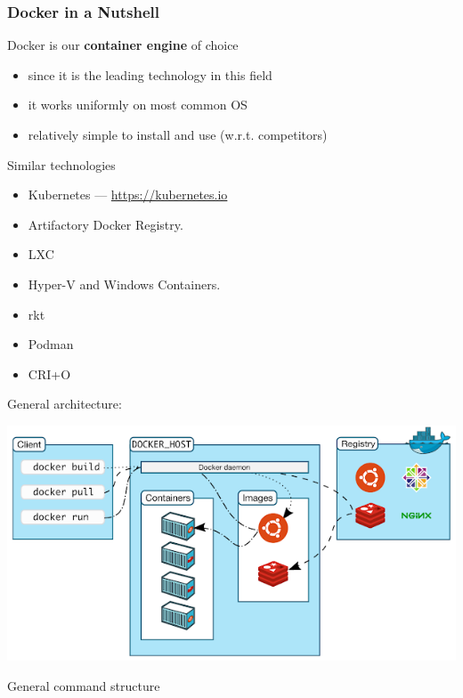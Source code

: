 \documentclass[presentation]{beamer}\mode<presentation>{\usetheme{AMSBolognaFC}}
\begin{document}
\begin{frame}[allowframebreaks]
\frametitle{Docker in a Nutshell}

    \begin{block}{Docker is our \textbf{container engine} of choice}
        \begin{itemize}
            \item since it is the leading technology in this field
            \item it works uniformly on most common OS
            \item relatively simple to install and use (w.r.t. competitors)
        \end{itemize}
    \end{block}

    \begin{block}{Similar technologies}
        \begin{itemize}
            \item Kubernetes --- \url{https://kubernetes.io}
            \item Artifactory Docker Registry.
            \item LXC
            \item Hyper-V and Windows Containers.
            \item rkt
            \item Podman
            \item CRI+O
        \end{itemize}
    \end{block}
    \framebreak
    General architecture:
    \begin{center}
        \includegraphics[width=.8\linewidth]{figures/client-vs-daemon.png}
    \end{center}

    \framebreak

    \begin{block}{General command structure}
        \centering\ttfamily


\end{block}
\end{frame}
\end{document}
